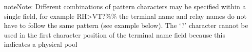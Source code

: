 \documentclass[letterpaper,10pt,english]{sphinxmanual}
\begin{document}
\begin{sphinxadmonition}{note}{Note:}
\sphinxAtStartPar
Different combinations of pattern characters may be specified within a single field, for example RH\textgreater{}VT?\%\% the terminal name and relay names do not have to follow the same pattern (see example below). The ‘?’ character cannot be used in the first character position of the terminal name field because this indicates a physical pool
\end{sphinxadmonition}

\begin{sphinxVerbatim}[commandchars=\\\{\}]
     
        
       
      
\end{sphinxVerbatim}
\end{document}
